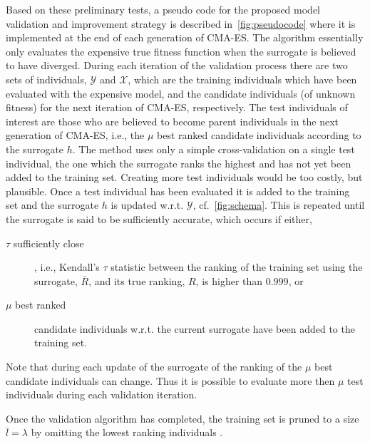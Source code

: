 Based on these preliminary tests, a pseudo code for the proposed model validation and improvement strategy is described in~\cref{fig:pseudocode} where it is implemented at the end of each generation of CMA-ES. The algorithm essentially only evaluates the expensive true fitness function when the surrogate is believed to have diverged. During each iteration of the validation process there are two sets of individuals, $\mathcal{Y}$ and $\mathcal{X}$, which are the training individuals  which have been evaluated with the expensive model, and the candidate individuals (of unknown fitness) for the next iteration of CMA-ES, respectively. The test individuals  of interest are those who are believed to become parent individuals  in the next generation of CMA-ES, i.e.,  the $\mu$ best ranked candidate individuals according to the surrogate $h$. The method uses only a simple cross-validation on a single test individual, the one which the surrogate ranks the highest and has not yet been added to the training set. Creating more test individuals  would be too costly, but plausible. Once a test individual has been evaluated it is added to the training set and the surrogate $h$ is updated w.r.t. $\mathcal{Y}$, cf.~\cref{fig:schema}. This is repeated until the surrogate is said to be sufficiently accurate, which occurs if either,
\begin{description}
	\item[$\tau$ sufficiently close], i.e.,  Kendall's $\tau$ statistic between the ranking of the training set using the surrogate, $\bar{R}$, and its true ranking, $R$, is higher than $0.999$, or 
	\item[$\mu$ best ranked] candidate individuals w.r.t. the current surrogate have been added to the training set.
\end{description}
Note that during each update of the surrogate of the ranking of the $\mu$ best candidate individuals can change. Thus it is possible to evaluate more then $\mu$ test individuals  during each validation iteration. 

Once the validation algorithm has completed, the training set is pruned to a size $\bar{l}=\lambda$ by omitting the lowest ranking individuals . 

